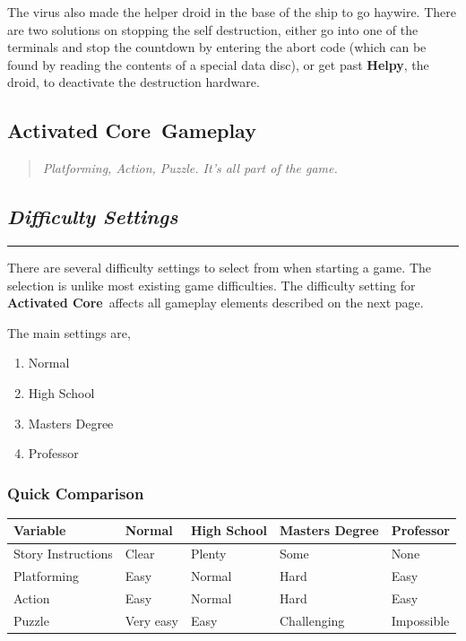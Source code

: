 \documentclass[a5paper, 10pt, titlepage, landscape, twoside, final]{article}
\newcommand{\ac}{\textbf{Activated Core}}
\begin{document}
The virus also made the helper droid in the base of the ship to go haywire. There are two solutions on stopping the self destruction, either go into one of the terminals and stop the countdown by entering the abort code (which can be found by reading the contents of a special data disc), or get past \textbf{Helpy}, the droid, to deactivate the destruction hardware.

\clearpage
\begin{center}
\section{\ac\ Gameplay}
\end{center}
%
\begin{quote}
  \centering
  \large{\textit{Platforming, Action, Puzzle. It's all part of the game.}}
\end{quote}

\begin{center}
\subsection{\textit{Difficulty Settings}}
\end{center}
\hrule\par
%
There are several difficulty settings to select from when starting a game. The selection is unlike most existing game difficulties. The difficulty setting for \ac\ affects all gameplay elements described on the next page.

The main settings are,
\begin{enumerate}
  \item Normal
  \item High School
  \item Masters Degree
  \item Professor
\end{enumerate}

\clearpage
\subsubsection{Quick Comparison}
\begin{table}[ht]
  \begin{center}
    \begin{tabular}{l|llll}
      \textbf{Variable} & \textbf{Normal} & \textbf{High School} & \textbf{Masters Degree} & \textbf{Professor} \\
      \hline
      \hline
      Story Instructions & Clear & Plenty & Some & None \\
      Platforming & Easy & Normal & Hard & Easy \\
      Action & Easy & Normal & Hard & Easy \\
      Puzzle & Very easy & Easy & Challenging & Impossible
    \end{tabular}
  \end{center}
\end{table}
\end{document}

